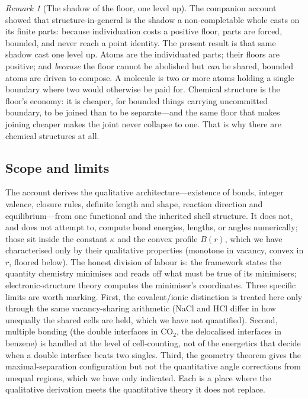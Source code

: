 \documentclass[11pt,twocolumn,a4paper]{article}
\theoremstyle{thmstyle}
\theoremstyle{definition}
\theoremstyle{remark}
\newtheorem{remark}[theorem]{Remark}
\newcommand{\thick}{B}                 %
\begin{document}
\begin{remark}[The shadow of the floor, one level up]
\label{rem:shadow}
The companion account showed that structure-in-general is the shadow a
non-completable whole casts on its finite parts: because individuation
costs a positive floor, parts are forced, bounded, and never reach a point
identity. The present result is that same shadow cast one level up. Atoms
are the individuated parts; their floors are positive; and \emph{because}
the floor cannot be abolished but \emph{can} be shared, bounded atoms are
driven to compose. A molecule is two or more atoms holding a single
boundary where two would otherwise be paid for. Chemical structure is the
floor's economy: it is cheaper, for bounded things carrying uncommitted
boundary, to be joined than to be separate---and the same floor that makes
joining cheaper makes the joint never collapse to one. That is why there
are chemical structures at all.
\end{remark}

\subsection{Scope and limits}

The account derives the qualitative architecture---existence of bonds,
integer valence, closure rules, definite length and shape, reaction
direction and equilibrium---from one functional and the inherited shell
structure. It does not, and does not attempt to, compute bond energies,
lengths, or angles numerically; those sit inside the constant $\kappa$ and
the convex profile $\thick(r)$, which we have characterised only by their
qualitative properties (monotone in vacancy, convex in $r$, floored
below). The honest division of labour is: the framework states the
quantity chemistry minimises and reads off what must be true of its
minimisers; electronic-structure theory computes the minimiser's
coordinates. Three specific limits are worth marking. First, the
covalent/ionic distinction is treated here only through the same
vacancy-sharing arithmetic (NaCl and HCl differ in how unequally the
shared cells are held, which we have not quantified). Second, multiple
bonding (the double interfaces in CO$_2$, the delocalised interfaces in
benzene) is handled at the level of cell-counting, not of the energetics
that decide when a double interface beats two singles. Third, the geometry
theorem gives the maximal-separation configuration but not the
quantitative angle corrections from unequal regions, which we have only
indicated. Each is a place where the qualitative derivation meets the
quantitative theory it does not replace.
\end{document}
